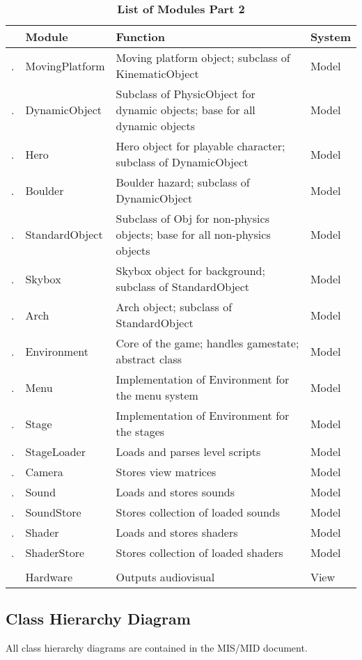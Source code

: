 \documentclass[12pt, titlepage]{article}
\newcounter{ModList}
\newcommand{\printMod}{
    \stepcounter{ModList}
    \arabic{ModList}.
}
\begin{document}
\begin{table}[h]
\caption{\bf List of Modules Part 2} \label{tab:modules2}
\begin{tabularx}{\textwidth}{p{0.4cm}p{3.5cm}p{6cm}X}
\toprule & {\bf Module} & {\bf Function} & {\bf System}\\
\midrule
\printMod & MovingPlatform & Moving platform object; subclass of KinematicObject & Model\\
\printMod & DynamicObject & Subclass of PhysicObject for dynamic objects; base for all dynamic objects & Model\\
\printMod & Hero & Hero object for playable character; subclass of DynamicObject & Model\\
\printMod & Boulder & Boulder hazard; subclass of DynamicObject & Model\\
\printMod & StandardObject & Subclass of Obj for non-physics objects; base for all non-physics objects & Model\\
\printMod & Skybox & Skybox object for background; subclass of StandardObject & Model\\
\printMod & Arch & Arch object; subclass of StandardObject & Model\\
\printMod & Environment & Core of the game; handles gamestate; abstract class & Model\\
\printMod & Menu & Implementation of Environment for the menu system & Model\\
\printMod & Stage & Implementation of Environment for the stages & Model\\
\printMod & StageLoader & Loads and parses level scripts & Model\\
\printMod & Camera & Stores view matrices & Model\\
\printMod & Sound & Loads and stores sounds & Model\\
\printMod & SoundStore & Stores collection of loaded sounds & Model\\
\printMod & Shader & Loads and stores shaders & Model\\
\printMod & ShaderStore & Stores collection of loaded shaders & Model\\
\\
 & Hardware & Outputs audiovisual & View\\
\bottomrule
\end{tabularx}
\end{table}

\FloatBarrier

\subsection{Class Hierarchy Diagram}
All class hierarchy diagrams are contained in the MIS/MID document.
\end{document}
